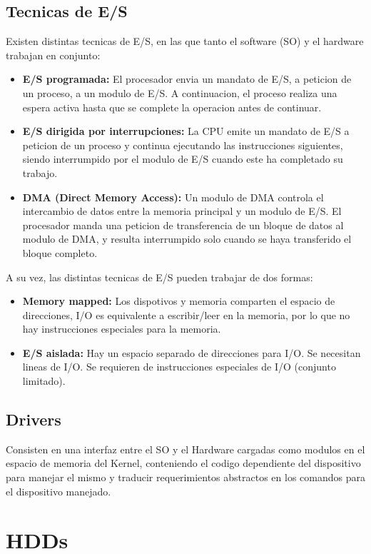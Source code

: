 \documentclass[12pt]{article}
\begin{document}
\subsection{Tecnicas de E/S}
Existen distintas tecnicas de E/S, en las que tanto el software (SO) y el hardware trabajan en conjunto:
\begin{itemize}
    \item \textbf{E/S programada:} El procesador envia un mandato de E/S, a peticion de un proceso, a un modulo de E/S. A continuacion, el proceso realiza una espera activa hasta que se complete la operacion antes de continuar.
    \item \textbf{E/S dirigida por interrupciones:} La CPU emite un mandato de E/S a peticion de un proceso y continua ejecutando las instrucciones siguientes, siendo interrumpido por el modulo de E/S cuando este ha completado su trabajo.
    \item \textbf{DMA (Direct Memory Access):} Un modulo de DMA controla el intercambio de datos entre la memoria principal y un modulo de E/S. El procesador manda una peticion de transferencia de un bloque de datos al modulo de DMA, y resulta interrumpido solo cuando se haya transferido el bloque completo.
\end{itemize}

A su vez, las distintas tecnicas de E/S pueden trabajar de dos formas:
\begin{itemize}
    \item \textbf{Memory mapped:} Los dispotivos y memoria comparten el espacio de direcciones, I/O es equivalente a escribir/leer en la memoria, por lo que no hay instrucciones especiales para la memoria.
    \item \textbf{E/S aislada:} Hay un espacio separado de direcciones para I/O. Se necesitan lineas de I/O. Se requieren de instrucciones especiales de I/O (conjunto limitado).
\end{itemize}


\subsection{Drivers}
Consisten en una interfaz entre el SO y el Hardware cargadas como modulos en el espacio de memoria del Kernel, conteniendo el codigo dependiente del dispositivo para manejar el mismo y traducir requerimientos abstractos en los comandos para el dispositivo manejado.




\section{HDDs}
\end{document}
